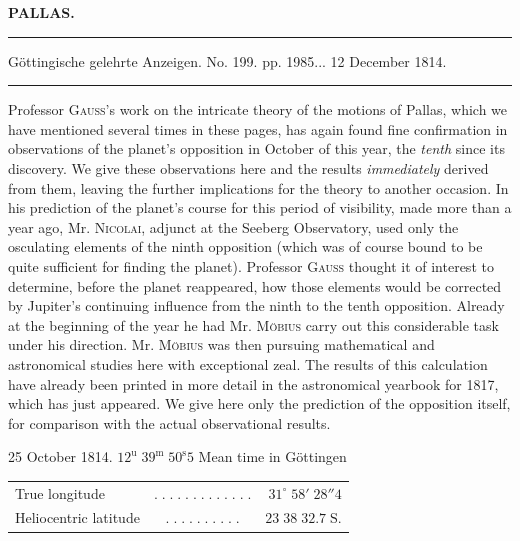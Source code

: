 \clearpage{}\hypertarget{native-384-lower}{}\label{native-384-lower}
\begin{center}\textbf{PALLAS.}\par\vspace{4pt}\hrule\vspace{4pt}\fontsize{10}{12}\selectfont Göttingische gelehrte Anzeigen. No. 199. pp. 1985\;... 12 December 1814.\par\vspace{4pt}\hrule\vspace{4pt}\end{center}

\par\indent Professor \textsc{Gauss}’s work on the intricate theory of the motions of Pallas, which we have mentioned several times in these pages, has again found fine confirmation in observations of the planet’s opposition in October of this year, the \emph{tenth} since its discovery. We give these observations here and the results \emph{immediately} derived from them, leaving the further implications for the theory to another occasion. In his prediction of the planet’s course for this period of visibility, made more than a year ago, Mr. \textsc{Nicolai}, adjunct at the Seeberg Observatory, used only the osculating elements of the ninth opposition (which was of course bound to be quite sufficient for finding the planet). Professor \textsc{Gauss} thought it of interest to determine, before the planet reappeared, how those elements would be corrected by Jupiter’s continuing influence from the ninth to the tenth opposition. Already at the beginning of the year he had Mr. \textsc{Möbius} carry out this considerable task under his direction. Mr. \textsc{Möbius} was then pursuing mathematical and astronomical studies here with exceptional zeal. The results of this calculation have already been printed in more detail in the astronomical yearbook for 1817, which has just appeared. We give here only the prediction of the opposition itself, for comparison with the actual observational results.

\begin{center}25 October 1814. $12^{\mathrm u}\;39^{\mathrm m}\;50^{\mathrm s}5$ Mean time in Göttingen\end{center}
\begin{center}\fontsize{10}{12}\selectfont\setlength{\tabcolsep}{3pt}\renewcommand{\arraystretch}{1.15}\begin{tabular}{lcr}
True longitude & $.\;.\;.\;.\;.\;.\;.\;.\;.\;.\;.\;.\;.$ & $31^\circ\;58'\;28''4$\\
Heliocentric latitude & $.\;.\;.\;.\;.\;.\;.\;.\;.\;.$ & $23\;38\;32.7\;\mathrm{S.}$\\
\end{tabular}\end{center}

